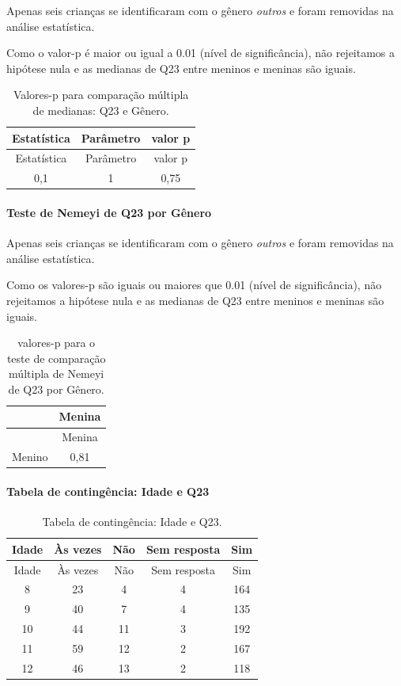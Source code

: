 \documentclass[]{article}
\let\oldparagraph\paragraph
\renewcommand{\paragraph}[1]{\oldparagraph{#1}\mbox{}}
\begin{document}
Apenas seis crianças se identificaram com o gênero \emph{outros} e foram removidas na análise estatística.

Como o valor-p é maior ou igual a 0.01 (nível de significância), não rejeitamos a hipótese nula e as medianas de Q23 entre meninos e meninas são iguais.

\begin{longtable}[]{@{}ccc@{}}
\caption{\label{tab:unnamed-chunk-560}Valores-p para comparação múltipla de medianas: Q23 e Gênero.}\tabularnewline
\toprule
Estatística & Parâmetro & valor p\tabularnewline
\midrule
\endfirsthead
\toprule
Estatística & Parâmetro & valor p\tabularnewline
\midrule
\endhead
0,1 & 1 & 0,75\tabularnewline
\bottomrule
\end{longtable}

\hypertarget{teste-de-nemeyi-de-q23-por-guxeanero}{%
\paragraph{Teste de Nemeyi de Q23 por Gênero}\label{teste-de-nemeyi-de-q23-por-guxeanero}}

Apenas seis crianças se identificaram com o gênero \emph{outros} e foram removidas na análise estatística.

Como os valores-p são iguais ou maiores que 0.01 (nível de significância), não rejeitamos a hipótese nula e as medianas de Q23 entre meninos e meninas são iguais.

\begin{longtable}[]{@{}lc@{}}
\caption{\label{tab:unnamed-chunk-562}valores-p para o teste de comparação múltipla de Nemeyi de Q23 por Gênero.}\tabularnewline
\toprule
& Menina\tabularnewline
\midrule
\endfirsthead
\toprule
& Menina\tabularnewline
\midrule
\endhead
Menino & 0,81\tabularnewline
\bottomrule
\end{longtable}

\cleardoublepage

\hypertarget{tabela-de-continguxeancia-idade-e-q23}{%
\paragraph{Tabela de contingência: Idade e Q23}\label{tabela-de-continguxeancia-idade-e-q23}}

\begin{longtable}[]{@{}ccccc@{}}
\caption{\label{tab:unnamed-chunk-563}Tabela de contingência: Idade e Q23.}\tabularnewline
\toprule
Idade & Às vezes & Não & Sem resposta & Sim\tabularnewline
\midrule
\endfirsthead
\toprule
Idade & Às vezes & Não & Sem resposta & Sim\tabularnewline
\midrule
\endhead
8 & 23 & 4 & 4 & 164\tabularnewline
9 & 40 & 7 & 4 & 135\tabularnewline
10 & 44 & 11 & 3 & 192\tabularnewline
11 & 59 & 12 & 2 & 167\tabularnewline
12 & 46 & 13 & 2 & 118\tabularnewline
\bottomrule
\end{longtable}
\end{document}
